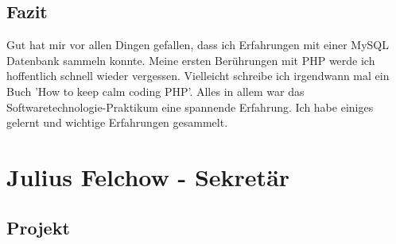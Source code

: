 \documentclass[a4paper]{scrreprt}
\begin{document}
\section{Fazit}
Gut hat mir vor allen Dingen gefallen, dass ich Erfahrungen mit einer MySQL Datenbank sammeln konnte. Meine ersten Berührungen mit PHP werde ich hoffentlich schnell wieder vergessen. Vielleicht schreibe ich irgendwann mal ein Buch 'How to keep calm coding PHP'.  
Alles in allem war das Softwaretechnologie-Praktikum eine spannende Erfahrung. Ich habe einiges gelernt und wichtige Erfahrungen gesammelt.  

\chapter{Julius Felchow - Sekretär}

\section{Projekt}
\end{document}
